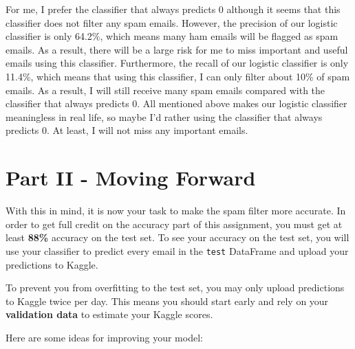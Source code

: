 \documentclass[11pt]{article}
\begin{document}
    For me, I prefer the classifier that always predicts 0 although it seems
that this classifier does not filter any spam emails. However, the
precision of our logistic classifier is only 64.2\%, which means many
ham emails will be flagged as spam emails. As a result, there will be a
large risk for me to miss important and useful emails using this
classifier. Furthermore, the recall of our logistic classifier is only
11.4\%, which means that using this classifier, I can only filter about
10\% of spam emails. As a result, I will still receive many spam emails
compared with the classifier that always predicts 0. All mentioned above
makes our logistic classifier meaningless in real life, so maybe I'd
rather using the classifier that always predicts 0. At least, I will not
miss any important emails.

    \section{Part II - Moving Forward}\label{part-ii---moving-forward}

With this in mind, it is now your task to make the spam filter more
accurate. In order to get full credit on the accuracy part of this
assignment, you must get at least \textbf{88\%} accuracy on the test
set. To see your accuracy on the test set, you will use your classifier
to predict every email in the \texttt{test} DataFrame and upload your
predictions to Kaggle.

To prevent you from overfitting to the test set, you may only upload
predictions to Kaggle twice per day. This means you should start early
and rely on your \textbf{validation data} to estimate your Kaggle
scores.

Here are some ideas for improving your model:
\end{document}
